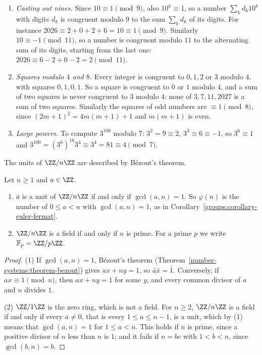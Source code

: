 \begin{example}\label{number-theory:example-congruences}
\begin{enumerate}
\item \emph{Casting out nines.} Since $10 \equiv 1 \pmod 9$, also $10^k \equiv 1$, so a number $\sum_kd_k10^k$ with digits $d_k$ is congruent modulo $9$ to the sum $\sum_kd_k$ of its digits. For instance
$2026 \equiv 2 + 0 + 2 + 6 = 10 \equiv 1 \pmod 9$. Similarly $10 \equiv -1 \pmod{11}$, so a number is congruent modulo $11$ to the alternating sum of its digits, starting from the last one:
$2026 \equiv 6 - 2 + 0 - 2 = 2 \pmod{11}$.
\item \emph{Squares modulo $4$ and $8$.} Every integer is congruent to $0, 1, 2$ or $3$ modulo $4$, with squares $0, 1, 0, 1$. So a square is congruent to $0$ or $1$ modulo $4$, and a sum of two squares
is never congruent to $3$ modulo $4$: none of $3, 7, 11, 2027$ is a sum of two squares. Similarly the squares of odd numbers are $\equiv 1 \pmod 8$, since $(2m + 1)^2 = 4m(m + 1) + 1$ and $m(m + 1)$ is
even.
\item \emph{Large powers.} To compute $3^{100}$ modulo $7$: $3^2 = 9 \equiv 2$, $3^3 \equiv 6 \equiv -1$, so $3^6 \equiv 1$ and $3^{100} = (3^6)^{16}3^4 \equiv 3^4 = 81 \equiv 4 \pmod 7$.
\end{enumerate}
\end{example}

The units of $\ZZ/n\ZZ$ are described by B\'ezout's theorem.

\begin{proposition}\label{number-theory:proposition-units}
Let $n \geq 1$ and $a \in \ZZ$.
\begin{enumerate}
\item $\bar{a}$ is a unit of $\ZZ/n\ZZ$ if and only if $\gcd(a, n) = 1$. So $\varphi(n)$ is the number of $0 \leq a < n$ with $\gcd(a, n) = 1$, as in Corollary~\ref{groups:corollary-euler-fermat}.
\item $\ZZ/n\ZZ$ is a field if and only if $n$ is prime. For a prime $p$ we write $\mathbb{F}_p = \ZZ/p\ZZ$.
\end{enumerate}
\end{proposition}

\begin{proof}
(1) If $\gcd(a, n) = 1$, B\'ezout's theorem (Theorem~\ref{number-systems:theorem-bezout}) gives $ax + ny = 1$, so $\bar{a}\bar{x} = \bar{1}$. Conversely, if $ax \equiv 1 \pmod n$, then $ax + ny = 1$ for
some $y$, and every common divisor of $a$ and $n$ divides $1$.

(2) $\ZZ/1\ZZ$ is the zero ring, which is not a field. For $n \geq 2$, $\ZZ/n\ZZ$ is a field if and only if every $\bar{a} \neq 0$, that is every $1 \leq a \leq n - 1$, is a unit, which by (1) means that
$\gcd(a, n) = 1$ for $1 \leq a < n$. This holds if $n$ is prime, since a positive divisor of $n$ less than $n$ is $1$; and it fails if $n = bc$ with $1 < b < n$, since $\gcd(b, n) = b$.
\end{proof}

